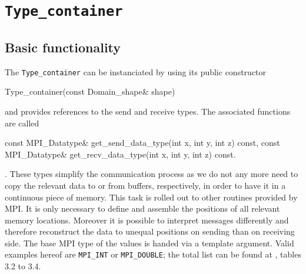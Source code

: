 \section{\texttt{Type\_container}}

\subsection{Basic functionality}
The \verb|Type_container| can be instanciated by using its public constructor
\begin{codelisting1}
	Type_container(const Domain_shape& shape)
\end{codelisting1}	
and provides references to the send and receive types. The associated functions are called
\begin{codelisting1}
 	const MPI_Datatype& get_send_data_type(int x, int y, int z) const,
 	const MPI_Datatype& get_recv_data_type(int x, int y, int z) const.
\end{codelisting1}. 	
These types simplify the communication process as we do not any more need to copy the relevant data to or from buffers, respectively, in order to have it in a continuous piece of memory. This task is rolled out to other routines provided by MPI. It is only necessary to define and assemble the positions of all relevant memory locations. Moreover it is possible to interpret messages differently and therefore reconstruct the data to unequal positions on sending than on receiving side. The base MPI type of the values is handed via a template argument. Valid examples hereof are \verb|MPI_INT| or \verb|MPI_DOUBLE|; the total list can be found at \cite{MPI_docu}, tables 3.2 to 3.4. 

